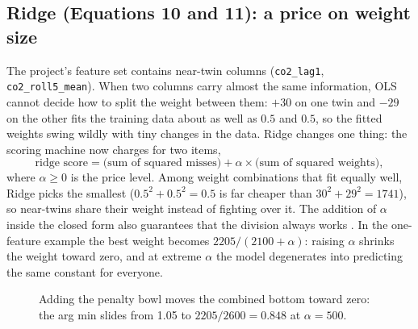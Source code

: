 \documentclass[11pt]{article}
\begin{document}
\subsection{Ridge (Equations 10 and 11): a price on weight size}

The project's feature set contains near-twin columns
(\texttt{co2\_lag1}, \texttt{co2\_roll5\_mean}). When two columns carry
almost the same information, OLS cannot decide how to split the weight
between them: $+30$ on one twin and $-29$ on the other fits the training
data about as well as $0.5$ and $0.5$, so the fitted weights swing wildly
with tiny changes in the data. Ridge changes one thing: the scoring
machine now charges for two items,
\[
\text{ridge score} = \text{(sum of squared misses)} +
\alpha \times \text{(sum of squared weights)} ,
\]
where $\alpha \ge 0$ is the price level. Among weight combinations that
fit equally well, Ridge picks the smallest ($0.5^2 + 0.5^2 = 0.5$ is far
cheaper than $30^2 + 29^2 = 1741$), so near-twins share their weight
instead of fighting over it. The addition of $\alpha$ inside the closed
form also guarantees that the division always works
\cite{hoerl1970ridge}. In the one-feature example the best weight becomes
$2205 / (2100 + \alpha)$: raising $\alpha$ shrinks the weight toward
zero, and at extreme $\alpha$ the model degenerates into predicting the
same constant for everyone.

\begin{figure}[ht]
\centering
{}
\caption{Adding the penalty bowl moves the combined bottom toward zero:
the arg min slides from 1.05 to $2205/2600 = 0.848$ at $\alpha = 500$.}
\label{fig:ridgebowl}
\end{figure}
\end{document}
